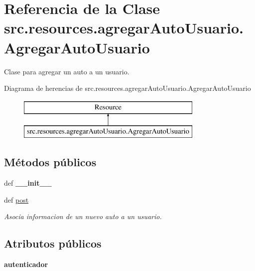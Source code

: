 \hypertarget{classsrc_1_1resources_1_1agregar_auto_usuario_1_1_agregar_auto_usuario}{\section{Referencia de la Clase src.\-resources.\-agregar\-Auto\-Usuario.\-Agregar\-Auto\-Usuario}
\label{classsrc_1_1resources_1_1agregar_auto_usuario_1_1_agregar_auto_usuario}
}


Clase para agregar un auto a un usuario.  


Diagrama de herencias de src.\-resources.\-agregar\-Auto\-Usuario.\-Agregar\-Auto\-Usuario\begin{figure}[H]
\begin{center}
\leavevmode
\includegraphics[height=2.000000cm]{classsrc_1_1resources_1_1agregar_auto_usuario_1_1_agregar_auto_usuario}
\end{center}
\end{figure}
\subsection*{Métodos públicos}
\begin{DoxyCompactItemize}
\item 
\hypertarget{classsrc_1_1resources_1_1agregar_auto_usuario_1_1_agregar_auto_usuario_ac497db4fdc43f3f587b2941704c1f3fd}{def {\bfseries \-\_\-\-\_\-init\-\_\-\-\_\-}}\label{classsrc_1_1resources_1_1agregar_auto_usuario_1_1_agregar_auto_usuario_ac497db4fdc43f3f587b2941704c1f3fd}

\item 
def \hyperlink{classsrc_1_1resources_1_1agregar_auto_usuario_1_1_agregar_auto_usuario_a2ac8095f1edcdd585d80155ddcc12344}{post}
\begin{DoxyCompactList}\small\item\em Asocia informacion de un nuevo auto a un usuario. \end{DoxyCompactList}\end{DoxyCompactItemize}
\subsection*{Atributos públicos}
\begin{DoxyCompactItemize}
\item 
\hypertarget{classsrc_1_1resources_1_1agregar_auto_usuario_1_1_agregar_auto_usuario_a815aacfb360ed387409ab7403e8bc8eb}{{\bfseries autenticador}}\label{classsrc_1_1resources_1_1agregar_auto_usuario_1_1_agregar_auto_usuario_a815aacfb360ed387409ab7403e8bc8eb}

\end{DoxyCompactItemize}
